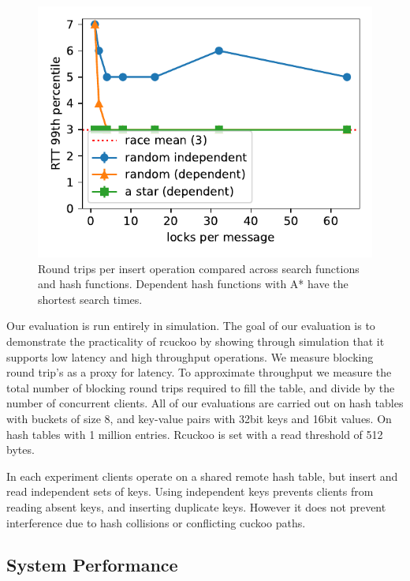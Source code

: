 \begin{figure}[ht]
    \includegraphics[width=0.99\linewidth]{fig/search_dependence.pdf}

    \caption{Round trips per insert operation compared
    across search functions and hash functions. Dependent
    hash functions with A* have the shortest search times.}

    \label{fig:search_dependence}
\end{figure}

Our evaluation is run entirely in simulation. The goal of
our evaluation is to demonstrate the practicality of rcuckoo
by showing through simulation that it supports low latency
and high throughput operations. We measure blocking round
trip's as a proxy for latency. To approximate throughput we
measure the total number of blocking round trips required to
fill the table, and divide by the number of concurrent
clients. All of our evaluations are carried out on hash
tables with buckets of size 8, and key-value pairs with
32bit keys and 16bit values. On hash tables with 1 million
entries. Rcuckoo is set with a read threshold of 512 bytes.

In each experiment clients operate on a shared remote hash
table, but insert and read independent sets of keys. Using
independent keys prevents clients from reading absent keys,
and inserting duplicate keys.  However it does not prevent
interference due to hash collisions or conflicting cuckoo
paths.


\subsection{System Performance}

